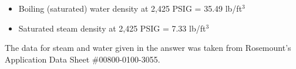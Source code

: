 \begin{itemize}
\item{} Boiling (saturated) water density at 2,425 PSIG = 35.49 lb/ft$^{3}$
\item{} Saturated steam density at 2,425 PSIG = 7.33 lb/ft$^{3}$
\end{itemize}








The data for steam and water given in the answer was taken from Rosemount's Application Data Sheet \#00800-0100-3055.




